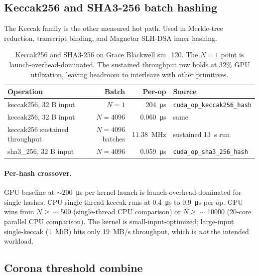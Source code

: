 \subsection{Keccak256 and SHA3-256 batch hashing}

The Keccak family \cite{keccak} is the other measured hot path.
Used in Merkle-tree reduction, transcript binding, and Magnetar
SLH-DSA inner hashing.

\begin{table}[h]
\centering
\small
\begin{tabular}{@{}lrrl@{}}
\toprule
\textbf{Operation} & \textbf{Batch} & \textbf{Per-op}
  & \textbf{Source} \\
\midrule
keccak256, 32 B input & $N{=}1$ & \SI{204}{\micro\second}
  & \texttt{cuda\_op\_keccak256\_hash} \\
keccak256, 32 B input & $N{=}4096$ & \SI{0.060}{\micro\second}
  & same \\
keccak256 sustained
  throughput & $N{=}4096$ batches
  & \SI{11.38}{\mega\hertz}
  & sustained \SI{13}{\second} run \\
sha3\_256, 32 B input & $N{=}4096$ & \SI{0.059}{\micro\second}
  & \texttt{cuda\_op\_sha3\_256\_hash} \\
\bottomrule
\end{tabular}
\caption{Keccak256 and SHA3-256 on Grace Blackwell sm\_120. The
$N{=}1$ point is launch-overhead-dominated. The sustained
throughput row holds at 32\% GPU utilization, leaving headroom
to interleave with other primitives.}
\label{tab:hash-measured}
\end{table}

\paragraph{Per-hash crossover.} GPU baseline at $\sim$\SI{200}{
\micro\second} per kernel launch is launch-overhead-dominated for
single hashes. CPU single-thread keccak runs at
\SI{0.4}{\micro\second} to \SI{0.9}{\micro\second} per op. GPU
wins from $N{\geq}\sim$\num{500} (single-thread CPU comparison)
or $N{\geq}\sim$\num{10000} (20-core parallel CPU comparison).
The kernel is small-input-optimized; large-input single-keccak
(\SI{1}{MiB}) hits only \SI{19}{MB/s} throughput, which is
\emph{not} the intended workload.

\subsection{Corona threshold combine}


